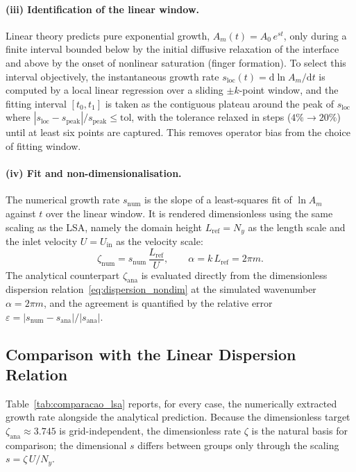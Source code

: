 \paragraph{(iii) Identification of the linear window.} Linear theory predicts pure exponential growth, $A_m(t) = A_0\,e^{s t}$, only during a finite interval bounded below by the initial diffusive relaxation of the interface and above by the onset of nonlinear saturation (finger formation). To select this interval objectively, the instantaneous growth rate $s_{\mathrm{loc}}(t) = \mathrm{d}\ln A_m/\mathrm{d}t$ is computed by a local linear regression over a sliding $\pm k$-point window, and the fitting interval $[t_0,t_1]$ is taken as the contiguous plateau around the peak of $s_{\mathrm{loc}}$ where $|s_{\mathrm{loc}} - s_{\mathrm{peak}}|/s_{\mathrm{peak}} \le \mathrm{tol}$, with the tolerance relaxed in steps ($4\% \to 20\%$) until at least six points are captured. This removes operator bias from the choice of fitting window.

\paragraph{(iv) Fit and non-dimensionalisation.} The numerical growth rate $s_{\mathrm{num}}$ is the slope of a least-squares fit of $\ln A_m$ against $t$ over the linear window. It is rendered dimensionless using the same scaling as the LSA, namely the domain height $L_{\mathrm{ref}} = N_y$ as the length scale and the inlet velocity $U = U_{\mathrm{in}}$ as the velocity scale:
\begin{equation}
    \zeta_{\mathrm{num}} = s_{\mathrm{num}}\,\frac{L_{\mathrm{ref}}}{U}, \qquad \alpha = k\,L_{\mathrm{ref}} = 2\pi m .
    \label{eq:zeta_num}
\end{equation}
The analytical counterpart $\zeta_{\mathrm{ana}}$ is evaluated directly from the dimensionless dispersion relation~\eqref{eq:dispersion_nondim} at the simulated wavenumber $\alpha = 2\pi m$, and the agreement is quantified by the relative error $\varepsilon = |s_{\mathrm{num}} - s_{\mathrm{ana}}|/|s_{\mathrm{ana}}|$.


\subsection{Comparison with the Linear Dispersion Relation}
\label{sec:lsa_comparison}

Table~\ref{tab:comparacao_lsa} reports, for every case, the numerically extracted growth rate alongside the analytical prediction. Because the dimensionless target $\zeta_{\mathrm{ana}} \approx 3.745$ is grid-independent, the dimensionless rate $\zeta$ is the natural basis for comparison; the dimensional $s$ differs between groups only through the scaling $s = \zeta\,U/N_y$.

